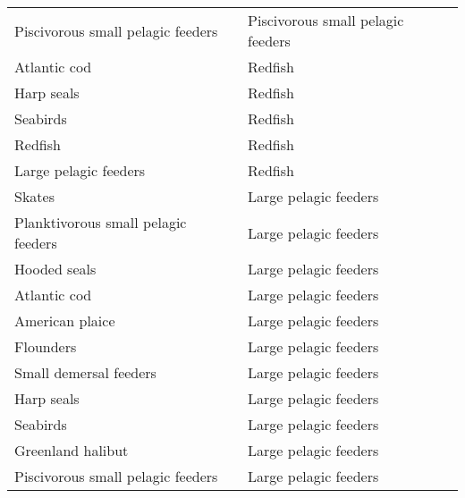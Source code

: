 \documentclass[letterpaper]{article}
\begin{document}
\begin{table}[h!]
\begin{tabular}{|l|l|}
      Piscivorous small pelagic feeders   & Piscivorous small pelagic feeders \\
      Atlantic cod                        & Redfish   \\
      Harp seals                          & Redfish   \\
      Seabirds                            & Redfish   \\
      Redfish                             & Redfish   \\
      Large pelagic feeders               & Redfish   \\
      Skates                              & Large pelagic feeders \\
      Planktivorous small pelagic feeders & Large pelagic feeders \\
      Hooded seals                        & Large pelagic feeders \\
      Atlantic cod                        & Large pelagic feeders \\
      American plaice                     & Large pelagic feeders \\
      Flounders                           & Large pelagic feeders \\
      Small demersal feeders              & Large pelagic feeders \\
      Harp seals                          & Large pelagic feeders \\
      Seabirds                            & Large pelagic feeders \\
      Greenland halibut                   & Large pelagic feeders \\
      Piscivorous small pelagic feeders   & Large pelagic feeders \\
      \hline
    \end{tabular}
\end{table}
\end{document}
